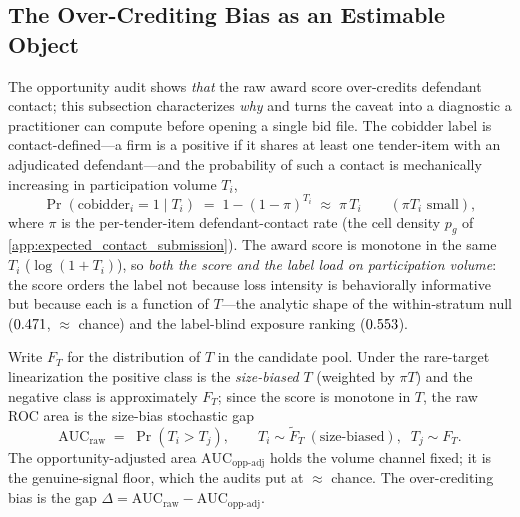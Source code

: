 \subsection{The Over-Crediting Bias as an Estimable Object}
\label{app:overcrediting_submission}

The opportunity audit shows \emph{that} the raw award score over-credits
defendant contact; this subsection characterizes \emph{why} and turns the
caveat into a diagnostic a practitioner can compute before opening a single
bid file. The cobidder label is contact-defined---a firm is a positive if
it shares at least one tender-item with an adjudicated defendant---and the
probability of such a contact is mechanically increasing in participation
volume $T_i$,
\begin{equation}
\Pr(\text{cobidder}_i = 1 \mid T_i)
   \;=\; 1 - (1-\pi)^{T_i}
   \;\approx\; \pi\,T_i \qquad (\pi T_i \text{ small}),
\label{eq:contact_sizebias}
\end{equation}
where $\pi$ is the per-tender-item defendant-contact rate (the cell
density $p_g$ of \ref{app:expected_contact_submission}). The award score
is monotone in the same $T_i$ ($\log(1{+}T_i)$), so \emph{both the score
and the label load on participation volume}: the score orders the label
not because loss intensity is behaviorally informative but because each is
a function of $T$---the analytic shape of the within-stratum null
($0.471$, $\approx$ chance) and the label-blind exposure
ranking ($0.553$).

Write $F_T$ for the distribution of $T$ in the candidate pool. Under the
rare-target linearization the positive class is the \emph{size-biased}
$T$ (weighted by $\pi T$) and the negative class is approximately $F_T$;
since the score is monotone in $T$, the raw ROC area is the size-bias
stochastic gap
\begin{equation}
\mathrm{AUC}_{\text{raw}}
  \;=\; \Pr(T_i > T_j),
  \qquad T_i \sim \widetilde F_T \ (\text{size-biased}),\;\;
  T_j \sim F_T .
\label{eq:auc_sizebias}
\end{equation}
The opportunity-adjusted area $\mathrm{AUC}_{\text{opp-adj}}$ holds the
volume channel fixed; it is the genuine-signal floor, which the audits
put at $\approx$ chance. The over-crediting bias is the gap
$\Delta = \mathrm{AUC}_{\text{raw}} - \mathrm{AUC}_{\text{opp-adj}}$.

